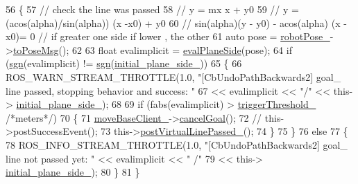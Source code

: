 \begin{DoxyCode}
56 \{
57   \textcolor{comment}{// check the line was passed}
58   \textcolor{comment}{// y = mx x + y0}
59   \textcolor{comment}{// y = (acos(alpha)/sin(alpha)) (x -x0) + y0}
60   \textcolor{comment}{// sin(alpha)(y - y0) - acos(alpha) (x -x0)= 0 // if greater one side if lower , the other}
61   \textcolor{keyword}{auto} pose = \hyperlink{classcl__move__base__z_1_1CbUndoPathBackwards2_a2d398dac07efaca840fbcea31957cf7a}{robotPose\_}->\hyperlink{classcl__move__base__z_1_1Pose_a9faf8c6b437ff6b19c8bddd692908dca}{toPoseMsg}();
62 
63   \textcolor{keywordtype}{float} evalimplicit = \hyperlink{classcl__move__base__z_1_1CbUndoPathBackwards2_a20b9a6799b0484810b0319f5a97d020e}{evalPlaneSide}(pose);
64   \textcolor{keywordflow}{if} (\hyperlink{namespacecl__move__base__z_ae144a2fabd00ba70fdc8099878cb3dac}{sgn}(evalimplicit) != \hyperlink{namespacecl__move__base__z_ae144a2fabd00ba70fdc8099878cb3dac}{sgn}(\hyperlink{classcl__move__base__z_1_1CbUndoPathBackwards2_abc388e4c9576f04d1fad869aa8651750}{initial\_plane\_side\_}))
65   \{
66     ROS\_WARN\_STREAM\_THROTTLE(1.0, \textcolor{stringliteral}{"[CbUndoPathBackwards2] goal\_ line passed, stopping behavior and success:
       "}
67                                       << evalimplicit << \textcolor{stringliteral}{"/"} << this->
      \hyperlink{classcl__move__base__z_1_1CbUndoPathBackwards2_abc388e4c9576f04d1fad869aa8651750}{initial\_plane\_side\_});
68 
69     \textcolor{keywordflow}{if} (fabs(evalimplicit) > \hyperlink{classcl__move__base__z_1_1CbUndoPathBackwards2_a452bcdab678ea02d6d6a0ae06fb484ab}{triggerThreshold\_} \textcolor{comment}{/*meters*/})
70     \{
71       \hyperlink{classcl__move__base__z_1_1CbMoveBaseClientBehaviorBase_ab2ef219464cfac8659b4a87c8d0db6d5}{moveBaseClient\_}->\hyperlink{classsmacc_1_1client__bases_1_1SmaccActionClientBase_aedeaf9704b73bf05b5522f7250416c9a}{cancelGoal}();
72       \textcolor{comment}{// this->postSuccessEvent();}
73       this->\hyperlink{classcl__move__base__z_1_1CbUndoPathBackwards2_a2405e8194c63dce4462b6d4910031fe8}{postVirtualLinePassed\_}();
74     \}
75   \}
76   \textcolor{keywordflow}{else}
77   \{
78     ROS\_INFO\_STREAM\_THROTTLE(1.0, \textcolor{stringliteral}{"[CbUndoPathBackwards2] goal\_ line not passed yet: "} << evalimplicit << \textcolor{stringliteral}{"
      /"}
79                                                                                        << this->
      \hyperlink{classcl__move__base__z_1_1CbUndoPathBackwards2_abc388e4c9576f04d1fad869aa8651750}{initial\_plane\_side\_});
80   \}
81 \}
\end{DoxyCode}
